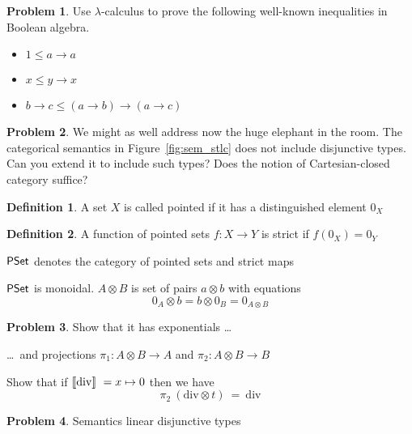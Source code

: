 \documentclass[a4paper, 11pt]{article}
\theoremstyle{definition}
\newtheorem{definition}{Definition}
\newtheorem{problem}{Problem}
\begin{document}
\begin{problem}
        Use $\lambda$-calculus to prove the following well-known inequalities
        in Boolean algebra.
        \begin{itemize}
                \item $1 \leq a \to a$
                \item $x \leq y \to x$
                \item $b \to c \leq (a \to b) \to (a \to c)$

        \end{itemize}
\end{problem}

\begin{problem}
        We might as well address now the huge elephant in the room. The
        categorical semantics in Figure~\ref{fig:sem_stlc} does not include
        disjunctive types. Can you extend it to include such types? Does the
        notion of Cartesian-closed category suffice?
\end{problem}
        \begin{definition}
                A set $X$ is called pointed if it has
                a distinguished element $0_X$
        \end{definition}

        \begin{definition}
                A function of pointed sets $f : X \to Y$ is
                strict if $f(0_X) = 0_Y$
        \end{definition}
\newcommand{\PSet}{\catfont{PSet}}

        $\PSet$ denotes the category of pointed sets and strict maps

        $\PSet$ is monoidal. $A \otimes B$ is set of pairs $a \otimes b$ with
        equations
        \[
                0_A \otimes b = b \otimes 0_B = 0_{A \otimes B}
        \]

\begin{problem}
        Show that it has exponentials \dots

        \dots\ and projections $\pi_1 : A \otimes B \to A$ and $\pi_2 : A
        \otimes B \to B$

        Show that if $\llbracket \mathrm{div} \rrbracket\ = x \mapsto 0$ then we have
        \[
                \pi_2\ (\mathrm{div} \otimes t)\ =\ \mathrm{div}
        \]
\end{problem}

\begin{problem}
        Semantics linear disjunctive types
\end{problem}
\newcommand{\typeI}{\typefont{I}}
\end{document}

